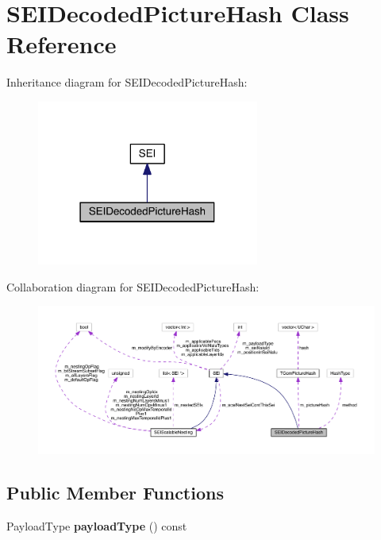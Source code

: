 \hypertarget{class_s_e_i_decoded_picture_hash}{}\section{S\+E\+I\+Decoded\+Picture\+Hash Class Reference}
\label{class_s_e_i_decoded_picture_hash}


Inheritance diagram for S\+E\+I\+Decoded\+Picture\+Hash\+:
\nopagebreak
\begin{figure}[H]
\begin{center}
\leavevmode
\includegraphics[width=207pt]{dc/d64/class_s_e_i_decoded_picture_hash__inherit__graph}
\end{center}
\end{figure}


Collaboration diagram for S\+E\+I\+Decoded\+Picture\+Hash\+:
\nopagebreak
\begin{figure}[H]
\begin{center}
\leavevmode
\includegraphics[width=350pt]{df/d24/class_s_e_i_decoded_picture_hash__coll__graph}
\end{center}
\end{figure}
\subsection*{Public Member Functions}
\begin{DoxyCompactItemize}
\item 
\mbox{\label{class_s_e_i_decoded_picture_hash_a200ead1d33ec2322589870a1e25a7cb4}} 
Payload\+Type {\bfseries payload\+Type} () const
\end{DoxyCompactItemize}

